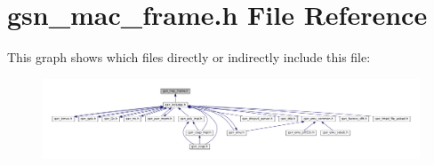 \hypertarget{a00523}{
\section{gsn\_\-mac\_\-frame.h File Reference}
\label{a00523}
}
This graph shows which files directly or indirectly include this file:
\nopagebreak
\begin{figure}[H]
\begin{center}
\leavevmode
\includegraphics[width=400pt]{a00758}
\end{center}
\end{figure}

